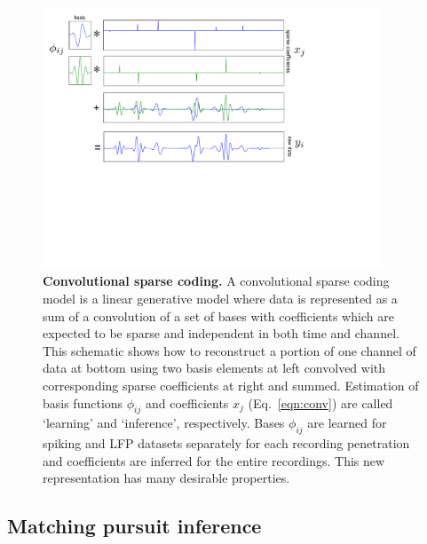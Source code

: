 \documentclass[10pt]{article}
\begin{document}
\begin{figure}[ht!]
  \centering
  \includegraphics[width=0.9\textwidth]{fig1.pdf}
  \caption{\textbf{Convolutional sparse coding.} A convolutional
    sparse coding model is a linear generative model where data is
    represented as a sum of a convolution of a set of bases with
    coefficients which are expected to be sparse and independent in
    both time and channel. This schematic shows how to reconstruct a
    portion of one channel of data at bottom using two basis elements
    at left convolved with corresponding sparse coefficients at right
    and summed. Estimation of basis functions $\phi_{ij}$ and
    coefficients $x_j$ (Eq.~\ref{eqn:conv}) are called
    `learning' and `inference', respectively. Bases $\phi_{ij}$ are
    learned for spiking and LFP datasets separately for each recording
    penetration and coefficients are inferred for the entire
    recordings. This new representation has many desirable
    properties.}
  \label{fig:sparseconvolution}
\end{figure}

\subsection{Matching pursuit inference}
\end{document}
